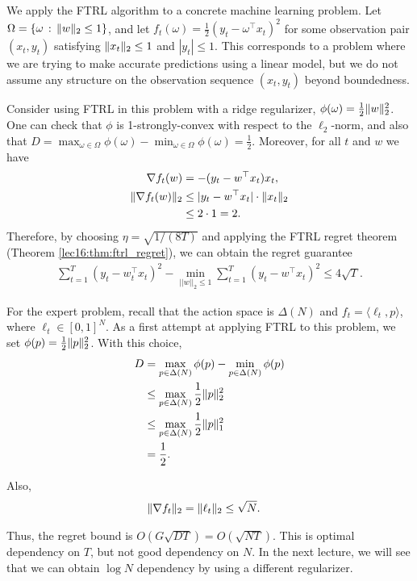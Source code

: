 
We apply the FTRL algorithm to a concrete machine learning problem. Let $\Omega = \{ \omega \, : \, \|w\|_2 \leq 1 \}$, and let $f_t(\omega) = \tfrac{1}{2}(y_t - \omega^{\top} x_t)^2$ for some observation pair $(x_t, y_t)$ satisfying $\|x_t\|_2 \leq 1$ and $|y_t| \leq 1$.  This corresponds to a problem where we are trying to make accurate predictions using a linear model, but we do not assume any structure on the observation sequence $(x_t, y_t)$ beyond boundedness.

Consider using FTRL in this problem with a ridge regularizer, $\phi(\omega) = \tfrac{1}{2} \|w\|_2^2$.  One can check that $\phi$ is 1-strongly-convex with respect to the $\ell_2$-norm, and also that $D = \max_{\omega \in \Omega} \phi(\omega) - \min_{\omega \in \Omega} \phi(\omega) = \tfrac{1}{2}$.  Moreover, for all $t$ and $w$ we have 
\begin{align}
\nabla f_t(w) &= - (y_t - w^\top x_t) x_t, \\
\|\nabla f_t(w)\|_2 &\leq |y_t - w^\top x_t| \cdot \|x_t\|_2 \\
&\leq 2 \cdot 1 = 2.
\end{align}
Therefore, by choosing $\eta = \sqrt{1/(8T)}$ and applying the FTRL regret theorem (Theorem \ref{lec16:thm:ftrl_regret}), we can obtain the regret guarantee
\begin{align}
\sum_{t = 1}^T (y_t - w_t^{\top} x_t)^2 - \min_{|| w ||_2 \leq 1} \sum_{t = 1}^T  (y_t - w^{\top} x_t)^2 \leq 4 \sqrt{T}.
\end{align}


For the expert problem, recall that the action space is $\Delta (N)$ and $f_t = \langle \ell_t , p \rangle$, where $\ell_t \in [0,1]^N$. As a first attempt at applying FTRL to this problem, we set $\phi (p) = \frac{1}{2}\|p\|_2^2$. With this choice,
\begin{align}
D &= \max_{p \in \Delta(N)} \phi (p) - \min_{p \in \Delta(N)} \phi (p) \\
&\leq \max_{p \in \Delta(N)} \frac{1}{2}\|p\|_2^2 \\
&\leq \max_{p \in \Delta(N)} \frac{1}{2}\|p\|_1^2 \\
&= \frac{1}{2}.
\end{align}

Also,
\begin{align}
\|\nabla f_t\|_2 &= \|\ell_t\|_2 \leq \sqrt{N}.
\end{align}

Thus, the regret bound is $O(G\sqrt{DT}) = O(\sqrt{NT})$. This is optimal dependency on $T$, but not good dependency on $N$. In the next lecture, we will see that we can obtain $\log N$ dependency by using a different regularizer.